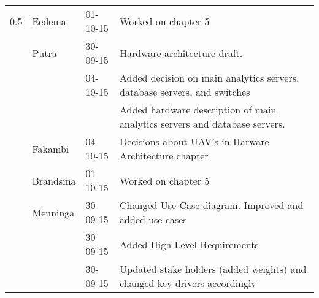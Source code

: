 \begin{longtable}{L{} L{} L{} L{}}
	0.5              & Eedema                & 01-10-15      & Worked on chapter 5                                                                                                                                                                                                        \\
					 & Putra                 & 30-09-15      & Hardware architecture draft.                                                                                                                                                                                               \\
					 & 		                 & 04-10-15      & Added decision on main analytics servers, database servers, and switches                                                                                                                                                   \\
	                 &                       &               & Added hardware description of main analytics servers and database servers.                                                                                                                                                 \\
					 & Fakambi               & 04-10-15      & Decisions about UAV's in Harware Architecture chapter\\
					 & Brandsma              & 01-10-15      & Worked on chapter 5                                                                                                                                                                                                        \\
		             & Menninga              & 30-09-15      & Changed Use Case diagram. Improved and added use cases                                                                                                                                                                     \\
	                 &                       & 30-09-15      & Added High Level Requirements                                                                                                                                                                                              \\
	                 &                       & 30-09-15      & Updated stake holders (added weights) and changed key drivers accordingly                                                                                                                                                  \\

\end{longtable}
